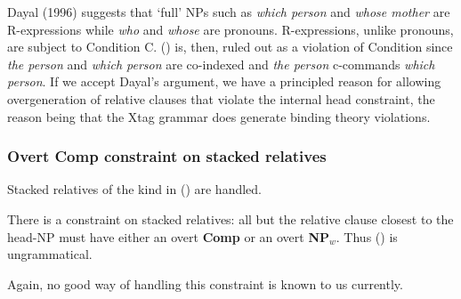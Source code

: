 Dayal (1996) suggests that `full' NPs such as {\em which person} and
{\em whose mother} are R-expressions while {\em who} and {\em whose}
are pronouns. R-expressions, unlike pronouns, are subject to Condition C.
() is, then, ruled out as a violation of Condition since {\em 
the person} and {\em which person} are co-indexed and {\em the person}
c-commands {\em which person}. If we accept Dayal's argument, we 
have a principled reason for allowing overgeneration of relative clauses
that violate the internal head constraint, the reason being that 
the Xtag grammar does generate binding theory violations.

\subsubsection{Overt Comp constraint on stacked relatives}
Stacked relatives of the kind in () are handled.


There is a constraint on stacked relatives: all but the relative clause
closest to the head-NP must have either an overt {\bf Comp} or 
an overt {\bf NP$_{w}$}. Thus () is ungrammatical.


Again, no good way of handling this constraint is known to us 
currently. 
